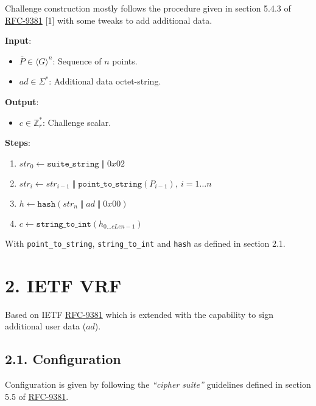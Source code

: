\documentclass[
]{article}
\providecommand{\tightlist}{%
  \setlength{\itemsep}{0pt}\setlength{\parskip}{0pt}}
\begin{document}
Challenge construction mostly follows the procedure given in section
5.4.3 of \href{https://datatracker.ietf.org/doc/rfc9381}{RFC-9381}
{[}1{]} with some tweaks to add additional data.

\textbf{Input}:

\begin{itemize}
\tightlist
\item
  \(\bar{P} \in \langle G \rangle^n\): Sequence of \(n\) points.
\item
  \(ad \in \Sigma^*\): Additional data octet-string.
\end{itemize}

\textbf{Output}:

\begin{itemize}
\tightlist
\item
  \(c \in \mathbb{Z}^*_r\): Challenge scalar.
\end{itemize}

\textbf{Steps}:

\begin{enumerate}
\def\labelenumi{\arabic{enumi}.}
\tightlist
\item
  \(str_0 \gets \texttt{suite\_string}\;\Vert\;0x02\)
\item
  \(str_i \gets str_{i-1}\;\Vert\;\texttt{point\_to\_string}(P_{i-1}),\ i = 1 \dots n\)
\item
  \(h \gets \texttt{hash}(str_n\;\Vert\;ad\;\Vert\;0x00)\)
\item
  \(c \gets \texttt{string\_to\_int}(h_{0 \dots cLen - 1})\)
\end{enumerate}

With \texttt{point\_to\_string}, \texttt{string\_to\_int} and
\texttt{hash} as defined in section 2.1.

\hypertarget{ietf-vrf}{%
\section{2. IETF VRF}\label{ietf-vrf}}

Based on IETF \href{https://datatracker.ietf.org/doc/rfc9381}{RFC-9381}
which is extended with the capability to sign additional user data
(\(ad\)).

\hypertarget{configuration}{%
\subsection{2.1. Configuration}\label{configuration}}

Configuration is given by following the \emph{``cipher suite''}
guidelines defined in section 5.5 of
\href{https://datatracker.ietf.org/doc/rfc9381}{RFC-9381}.
\end{document}
